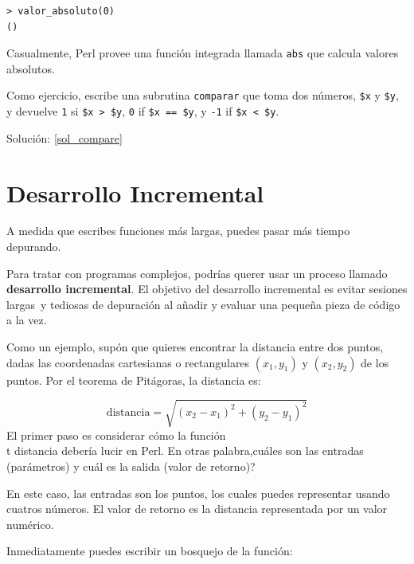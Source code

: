 \begin{lstlisting}
> valor_absoluto(0)
()
\end{lstlisting}
%
Casualmente, Perl provee una función integrada
llamada {\tt abs} que calcula valores absolutos.

\label{compare}
Como ejercicio, escribe una subrutina {\tt comparar}
que toma dos números, {\tt \$x} y {\tt \$y}, y devuelve
{\tt 1} si {\tt \$x > \$y}, {\tt 0} if {\tt \$x == \$y}, y 
{\tt -1} if {\tt \$x < \$y}.

Solución: \ref{sol_compare}


\section{Desarrollo Incremental}
\label{incremental.development}

A medida que escribes funciones más largas, puedes 
pasar más tiempo depurando.

Para tratar con programas complejos, podrías querer 
usar un proceso llamado {\bf desarrollo incremental}. El 
objetivo del desarrollo incremental es evitar sesiones largas\
y tediosas de depuración al añadir y evaluar una pequeña pieza
de código a la vez.

Como un ejemplo, supón que quieres encontrar la distancia 
entre dos puntos, dadas las coordenadas cartesianas o rectangulares
$(x_1, y_1)$ y $(x_2, y_2)$ de los puntos. Por el teorema de Pitágoras,
la distancia es:


\begin{displaymath}
\mathrm{distancia} = \sqrt{(x_2 - x_1)^2 + (y_2 - y_1)^2}
\end{displaymath}
%
El primer paso es considerar cómo la función {\\t distancia} 
debería lucir en Perl. En otras palabra,cuáles son las entradas (parámetros)
y cuál es la salida (valor de retorno)?

En este caso, las entradas son los puntos, los cuales puedes 
representar usando cuatros números. El valor de retorno es la distancia
representada por un valor numérico.

Inmediatamente puedes escribir un bosquejo de la función:

